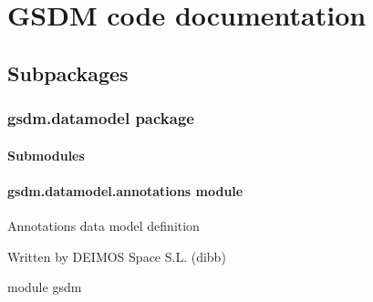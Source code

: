 \chapter{GSDM code documentation}
\section{Subpackages}
\label{\detokenize{gsdm:subpackages}}

\subsection{gsdm.datamodel package}
\label{\detokenize{gsdm.datamodel:gsdm-datamodel-package}}\label{\detokenize{gsdm.datamodel::doc}}

\subsubsection{Submodules}
\label{\detokenize{gsdm.datamodel:submodules}}

\subsubsection{gsdm.datamodel.annotations module}
\label{\detokenize{gsdm.datamodel:module-gsdm.datamodel.annotations}}\label{\detokenize{gsdm.datamodel:gsdm-datamodel-annotations-module}}
Annotations data model definition

Written by DEIMOS Space S.L. (dibb)

module gsdm

